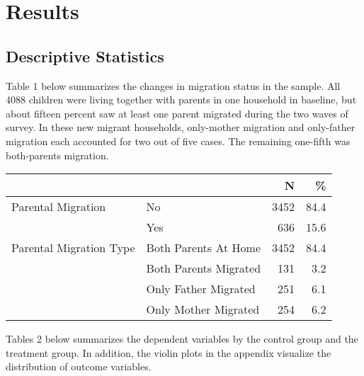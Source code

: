 \documentclass[
  man,floatsintext]{apa7}
\begin{document}
\newpage

\hypertarget{results}{%
\section{Results}\label{results}}

\hypertarget{descriptive-statistics}{%
\subsection{Descriptive Statistics}\label{descriptive-statistics}}

Table 1 below summarizes the changes in migration status in the sample. All 4088 children were living together with parents in one household in baseline, but about fifteen percent saw at least one parent migrated during the two waves of survey. In these new migrant households, only-mother migration and only-father migration each accounted for two out of five cases. The remaining one-fifth was both-parents migration.

\renewcommand{\arraystretch}{0.75}

\begin{longtable}[]{@{}llrr@{}}
\toprule
& & N & \% \\
\midrule
\endhead
Parental Migration & No & 3452 & 84.4 \\
& Yes & 636 & 15.6 \\
Parental Migration Type & Both Parents At Home & 3452 & 84.4 \\
& Both Parents Migrated & 131 & 3.2 \\
& Only Father Migrated & 251 & 6.1 \\
& Only Mother Migrated & 254 & 6.2 \\
\bottomrule
\end{longtable}

\newpage

Tables 2 below summarizes the dependent variables by the control group and the treatment group. In addition, the violin plots in the appendix visualize the distribution of outcome variables.
\end{document}
